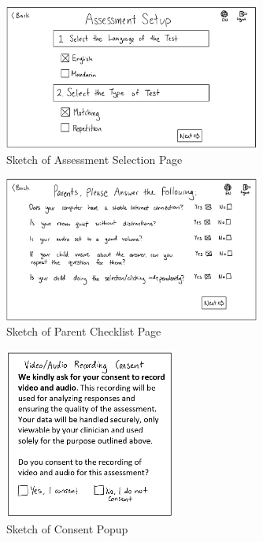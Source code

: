 \documentclass[12pt, titlepage]{article}
\begin{document}
\begin{figure}[H]
  \centering
  \includegraphics[width=0.75\textwidth]{images/TestSelection.png}
  \caption{Sketch of Assessment Selection Page}
  \label{FigTS}
\end{figure}

\begin{figure}[H]
  \centering
  \includegraphics[width=0.75\textwidth]{images/ParentChecklist.png}
  \caption{Sketch of Parent Checklist Page}
  \label{figPC}
\end{figure}

\begin{figure}[H]
  \centering
  \includegraphics[width=0.5\textwidth]{images/ConsentPopup.png}
  \caption{Sketch of Consent Popup}
  \label{figCP}
\end{figure}
\end{document}
